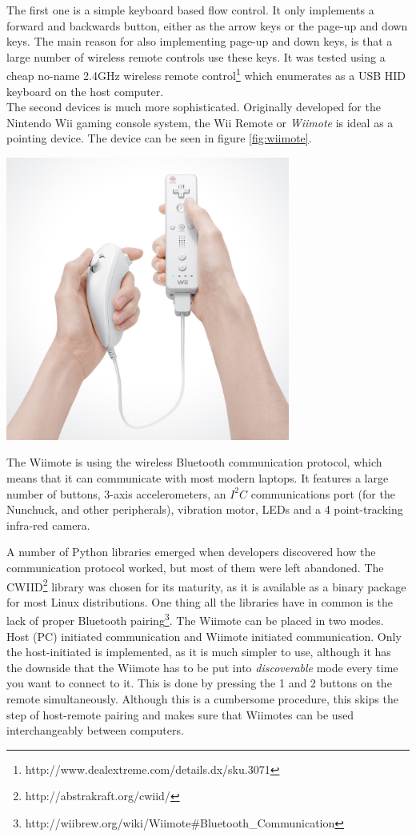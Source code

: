 \documentclass[a4paper,12pt]{article}
\begin{document}
The first one is a simple keyboard based flow control. It only implements a forward and backwards button, either as the arrow keys or the page-up and down keys. The main reason for also implementing page-up and down keys, is that a large number of wireless remote controls use these keys. It was tested using a cheap no-name 2.4GHz wireless remote control\footnote{http://www.dealextreme.com/details.dx/sku.3071} which enumerates as a USB HID keyboard on the host computer.
\\

The second devices is much more sophisticated. Originally developed for the Nintendo Wii gaming console system, the Wii Remote or \emph{Wiimote} is ideal as a pointing device. The device can be seen in figure \ref{fig:wiimote}.

\begin{center}
	\includegraphics[width=0.70\textwidth]{wiimote.jpg}
	\label{fig:wiimote}
\end{center}

The Wiimote is using the wireless Bluetooth communication protocol, which means that it can communicate with most modern laptops. It features a large number of buttons, 3-axis accelerometers, an $I^2C$ communications port (for the Nunchuck, and other peripherals), vibration motor, LEDs and a 4 point-tracking infra-red camera.

A number of Python libraries emerged when developers discovered how the communication protocol worked, but most of them were left abandoned. The CWIID\footnote{http://abstrakraft.org/cwiid/} library was chosen for its maturity, as it is available as a binary package for most Linux distributions. One thing all the libraries have in common is the lack of proper Bluetooth pairing\footnote{http://wiibrew.org/wiki/Wiimote\#Bluetooth\_Communication}. The Wiimote can be placed in two modes. Host (PC) initiated communication and Wiimote initiated communication. Only the host-initiated is implemented, as it is much simpler to use, although it has the downside that the Wiimote has to be put into \emph{discoverable} mode every time you want to connect to it. This is done by pressing the 1 and 2 buttons on the remote simultaneously. Although this is a cumbersome procedure, this skips the step of host-remote pairing and makes sure that Wiimotes can be used interchangeably between computers. 
\end{document}
